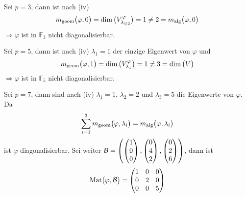 \documentclass{scrreprt}
\newcommand{\Mat}{\text{Mat}}
\begin{document}
\begin{enumerate}[(i)]
  Sei $p = 3$, dann ist nach (iv)
  \[
    m_{\text{geom}}\qty\big(\varphi, 0) =
    \dim\qty\big(V_{\lambda_{1|2}}^{\varphi}) = 1 \ne
    2 = m_{\text{alg}}\qty\big(\varphi, 0)
  \]
  $\Rightarrow \varphi$ ist in $\mathbb{F}_3$ nicht diagonalisierbar.

  Sei $p = 5$, dann ist nach (iv) $\lambda_1 = 1$ der einzige Eigenwert von
  $\varphi$ und
  \[
    m_{\text{geom}}\qty\big(\varphi, 1) =
    \dim\qty\big(V_{\lambda_{1}}^{\varphi}) = 1 \ne
    3 = \dim\qty\big(V)
  \]
  $\Rightarrow \varphi$ ist in $\mathbb{F}_5$ nicht diagonalisierbar.

  Sei $p = 7$, dann sind nach (iv) $\lambda_1 = 1$, $\lambda_2 = 2$ und
  $\lambda_3 = 5$ die Eigenwerte von $\varphi$.
  Da
  \[
    \sum_{i = 1}^3
    m_{\text{geom}}\qty\big(\varphi, \lambda_i) =
    m_{\text{alg}}\qty\big(\varphi, \lambda_i)
  \]
  ist $\varphi$ diagonalisierbar.
  Sei weiter $\mathcal{B} = \qty(
    \begin{pmatrix}1\\0\\0\end{pmatrix},
    \begin{pmatrix}0\\4\\2\end{pmatrix},
    \begin{pmatrix}0\\2\\6\end{pmatrix}
  )$, dann ist
  \[
    \Mat\qty\big(\varphi, \mathcal{B}) = \begin{pmatrix}
      1 & 0 & 0 \\
      0 & 2 & 0 \\
      0 & 0 & 5 \\
    \end{pmatrix}
  \]
\end{enumerate}
\end{document}
